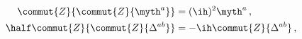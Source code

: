 \begin{equation}
\label{eq:cond1}
\begin{split}
\commut{Z}{\commut{Z}{\myth^a}}&=(\ih)^2\myth^a\,,\\
\half\commut{Z}{\commut{Z}{\Delta^{ab}}}&=-\ih\commut{Z}{\Delta^{ab}}\,,
\end{split}
\end{equation}

